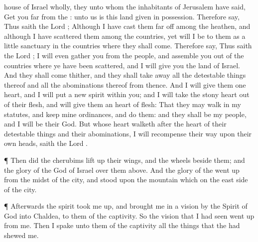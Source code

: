 {house of
Israel wholly,
{} they unto whom the
inhabitants of
Jerusalem have
said, Get you
far from the
{}: unto us is this
land
given in
possession.
Therefore
say, Thus
saith the
Lord
{}; Although I have cast them far
off among the
heathen, and although I have
scattered them among the
countries, yet will I be to them as a
little
sanctuary in the
countries where they shall
come.
Therefore
say, Thus
saith the
Lord
{}; I will even
gather you from the
people, and
assemble you out of the
countries where ye have been
scattered, and I will
give you the
land of
Israel.
And they shall
come thither, and they shall take
away all the detestable
things thereof and all the
abominations thereof from thence.
And I will
give them
one
heart, and I will
put a
new
spirit
within you; and I will
take the
stony
heart out of their
flesh, and will
give them an
heart of
flesh:
That they may
walk in my
statutes, and
keep mine
ordinances, and
do them: and they shall be my
people, and I will be their
God.
But
{} whose
heart
walketh after the
heart of their detestable
things and their
abominations, I will
recompense their
way upon their own
heads,
saith the
Lord
{}.
\par }{\PP {}¶ Then did the
cherubims lift
up their
wings, and the
wheels
beside them; and the
glory of the
God of
Israel
{} over them
above.
And the
glory of the
{} went
up from the
midst of the
city, and
stood upon the
mountain which
{} on the east
side of the
city.
\par }{\PP {}¶ Afterwards the
spirit took me
up, and
brought me in a
vision by the
Spirit of
God into
Chaldea, to them of the
captivity. So the
vision that I had
seen went
up from me.
Then I
spake unto them of the
captivity all the
things that the
{} had
shewed me.

}
